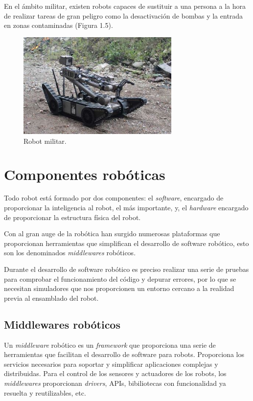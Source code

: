 \documentclass[a4paper, 12pt]{book}
\begin{document}
En el ámbito militar, existen robots capaces de sustituir a una persona a la hora de realizar tareas de gran peligro como la desactivación de bombas y la entrada en zonas contaminadas (Figura 1.5).

\begin{figure}[H]
	\centering
    \includegraphics[width=8cm]{img/robot_militar}
    \caption{Robot militar.}
    \label{figura:coche_autonomo}
\end{figure}

\section{Componentes robóticas}
\label{subsec:componentes roboticas}

Todo robot está formado por dos componentes: el \textit{software}, encargado de proporcionar la inteligencia al robot, el más importante, y, el \textit{hardware} encargado de proporcionar la estructura física del robot.

Con al gran auge de la robótica han surgido numerosas plataformas que proporcionan herramientas que simplifican el desarrollo de software robótico, esto son los denominados \textit{middlewares} robóticos.

Durante el desarrollo de software robótico es preciso realizar una serie de pruebas para comprobar el funcionamiento del código y depurar errores, por lo que se necesitan simuladores que nos proporcionen un entorno cercano a la realidad previa al ensamblado del robot.

\subsection{Middlewares robóticos}
\label{subsec:middlewares}

Un \textit{middleware} robótico es un \textit{framework} que proporciona una serie de herramientas que facilitan el desarrollo de software para robots. Proporciona los servicios necesarios para soportar y simplificar aplicaciones complejas y distribuidas. Para el control de los sensores y actuadores de los robots, los \textit{middlewares} proporcionan \textit{drivers}, APIs, bibiliotecas con funcionalidad ya resuelta y reutilizables, etc.
\end{document}
